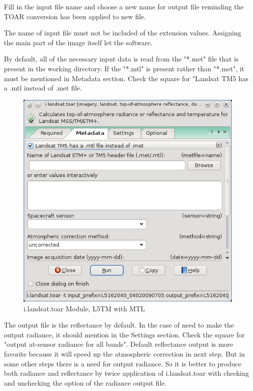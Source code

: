 Fill in the input file name and choose a new name for output file reminding the TOAR conversion has been applied to new file.\newline

The name of input file must not be included of the extension values. Assigning the main part of the image itself let the software.\newline 

By default, all of the necessary input data is read from the "*.met" file that is present in the working directory. If the "*.mtl" is present rather than "*.met", it must be mentioned in Metadata section. Check the square for "Landsat TM5 has a .mtl instead of .met file.\newline

\begin{figure}[htbp]
   \centering
   \includegraphics[scale=0.4]{gipe013.png}
   \caption{i.landsat.toar Module, L5TM with MTL}
   \label{fig:gipe013}
\end{figure}

The output file is the reflectance by default. In the case of need to make the output radiance, it should mention in the Settings section.  Check the square for "output at-sensor radiance for all bands".\newline
Default reflectance output is more favorite because it will speed up the atmospheric correction in next step. But in some other steps there is a need for output radiance. So it is better to produce both radiance and reflectance by twice application of i.landsat.toar with checking and unchecking the  option of the radiance output file. \newline

